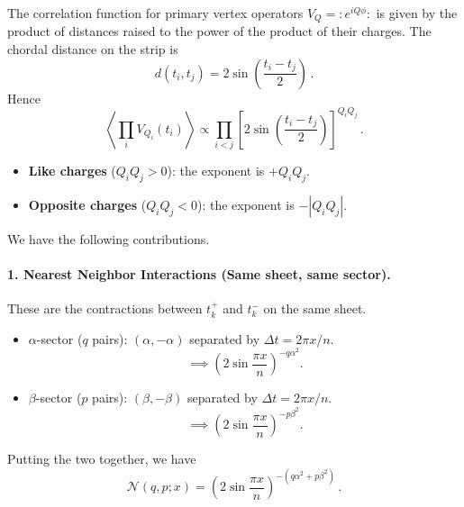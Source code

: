 \documentclass[11pt]{article}
\begin{document}
The correlation function for primary vertex operators $V_{Q} = :e^{i Q \phi}:$ is given by the product of distances raised to the power of the product of their charges. The chordal distance on the strip is
\begin{equation}
d(t_i, t_j) = 2 \sin\left(\frac{t_i - t_j}{2}\right)\,.
\end{equation}
Hence
\begin{equation}
\left\langle \prod_{i} V_{Q_i}(t_i) \right\rangle \propto
\prod_{i<j} \left[ 2 \sin\left( \frac{t_i - t_j}{2} \right) \right]^{Q_i Q_j}\,.
\end{equation}
\begin{itemize}
    \item \textbf{Like charges} ($Q_i Q_j > 0$): the exponent is $+Q_i Q_j$.
    \item \textbf{Opposite charges} ($Q_i Q_j < 0$): the exponent is $-|Q_i Q_j|$.
\end{itemize}

We have the following contributions.

\paragraph{1. Nearest Neighbor Interactions (Same sheet, same sector).}
These are the contractions between $t_k^+$ and $t_k^-$ on the same sheet.
\begin{itemize}
    \item $\alpha$-sector ($q$ pairs): $(\alpha, -\alpha)$ separated by $\Delta t = 2\pi x/n$.
    \[
    \implies \left( 2 \sin \frac{\pi x}{n} \right)^{-q \alpha^2}.
    \]
    \item $\beta$-sector ($p$ pairs): $(\beta, -\beta)$ separated by $\Delta t = 2\pi x/n$.
    \[
    \implies \left( 2 \sin \frac{\pi x}{n} \right)^{-p \beta^2}.
    \]
\end{itemize}
Putting the two together, we have
\begin{equation}\label{Nfunc}
  \mathcal{N}(q,p;x)=\left( 2 \sin \frac{\pi x}{n} \right)^{-(q\alpha^2+p\beta^2)}\,.
\end{equation}
\end{document}
